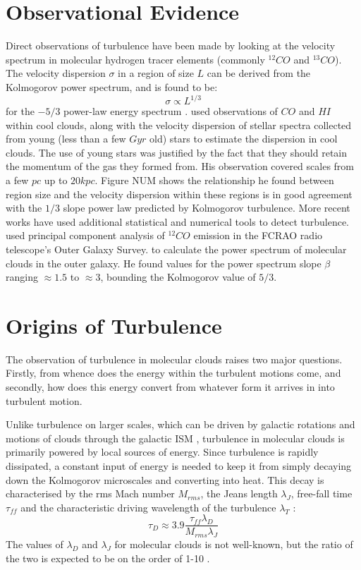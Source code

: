 \documentclass[12pt, preprint]{aastex}
\begin{document}
\section{Observational Evidence}
Direct observations of turbulence have been made by looking at the velocity
spectrum in molecular hydrogen tracer elements (commonly $^{12}CO$ and
$^{13}CO$). The velocity dispersion $\sigma$ in a region of size $L$ can be
derived from the Kolmogorov power spectrum, and is found to be:
$$\sigma \propto L^{1/3}$$
for the $-5/3$ power-law energy spectrum \citep{larson1979}.
\citet{larson1979} used observations of $CO$ and $HI$ within cool
clouds, along with the velocity dispersion of stellar spectra collected from
young (less than a few $Gyr$ old) stars to estimate the dispersion in cool clouds.  
The use of young stars was justified by the fact that they should retain the
momentum of the gas they formed from.  His
observation covered scales from a few $pc$ up to $20 kpc$.  Figure NUM shows
the relationship he found between region size and the velocity dispersion
within these regions is in good agreement with the $1/3$ slope power law
predicted by Kolmogorov turbulence.
More recent works have used additional statistical and numerical tools to detect
turbulence.  \citet{brunt2003} used principal component analysis of $^{12}CO$
emission in the FCRAO radio telescope's Outer Galaxy Survey.  to calculate the
power spectrum of molecular clouds in the outer galaxy.  He found values for the
power spectrum slope $\beta$ ranging $\approx 1.5$ to $\approx 3$, bounding the
Kolmogorov value of $5/3$.
\section{Origins of Turbulence}
The observation of turbulence in molecular clouds raises two major questions.
Firstly, from whence does the energy within the turbulent motions come, and
secondly, how does this energy convert from whatever form it arrives in into 
turbulent motion.

Unlike turbulence on larger scales, which can be driven by galactic rotations
and motions of clouds through the galactic ISM \citep{balb1991}, turbulence in
molecular clouds is primarily powered by local sources of energy.  Since
turbulence is rapidly dissipated, a constant input of energy is needed to keep
it from simply decaying down the Kolmogorov microscales and converting into
heat.  This decay is characterised by the rms Mach number $M_{rms}$, the Jeans
length $\lambda_J$, free-fall time $\tau_{ff}$ and the characteristic driving 
wavelength of the turbulence $\lambda_T$ \citep{mac1999}:
$$ \tau_D \approx 3.9 \frac{\tau_{ff}\lambda_D}{M_{rms}\lambda_J}$$
The values of $\lambda_D$ and $\lambda_J$ for molecular clouds is not
well-known, but the ratio of the two is expected to be on the order of 1-10
\citep{mac2004}.
\end{document}
